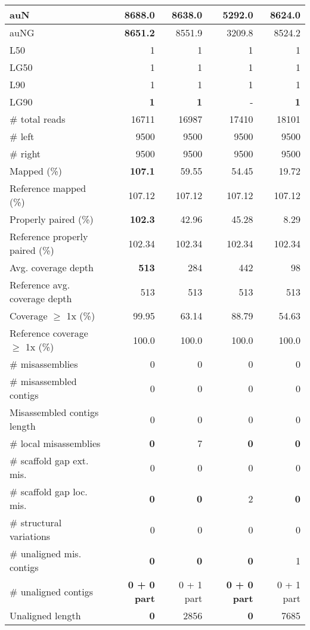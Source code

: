 \documentclass[12pt,a4paper]{article}
\begin{document}
\begin{table}[ht]
\begin{center}
\begin{tabular}{|l*{4}{|r}|}
auN & {\bf 8688.0} & 8638.0 & 5292.0 & 8624.0 \\ \hline
auNG & {\bf 8651.2} & 8551.9 & 3209.8 & 8524.2 \\ \hline
L50 & 1 & 1 & 1 & 1 \\ \hline
LG50 & 1 & 1 & 1 & 1 \\ \hline
L90 & 1 & 1 & 1 & 1 \\ \hline
LG90 & {\bf 1} & {\bf 1} & - & {\bf 1} \\ \hline
\# total reads & 16711 & 16987 & 17410 & 18101 \\ \hline
\# left & 9500 & 9500 & 9500 & 9500 \\ \hline
\# right & 9500 & 9500 & 9500 & 9500 \\ \hline
Mapped (\%) & {\bf 107.1} & 59.55 & 54.45 & 19.72 \\ \hline
Reference mapped (\%) & 107.12 & 107.12 & 107.12 & 107.12 \\ \hline
Properly paired (\%) & {\bf 102.3} & 42.96 & 45.28 & 8.29 \\ \hline
Reference properly paired (\%) & 102.34 & 102.34 & 102.34 & 102.34 \\ \hline
Avg. coverage depth & {\bf 513} & 284 & 442 & 98 \\ \hline
Reference avg. coverage depth & 513 & 513 & 513 & 513 \\ \hline
Coverage $\geq$ 1x (\%) & 99.95 & 63.14 & 88.79 & 54.63 \\ \hline
Reference coverage $\geq$ 1x (\%) & 100.0 & 100.0 & 100.0 & 100.0 \\ \hline
\# misassemblies & 0 & 0 & 0 & 0 \\ \hline
\# misassembled contigs & 0 & 0 & 0 & 0 \\ \hline
Misassembled contigs length & 0 & 0 & 0 & 0 \\ \hline
\# local misassemblies & {\bf 0} & 7 & {\bf 0} & {\bf 0} \\ \hline
\# scaffold gap ext. mis. & 0 & 0 & 0 & 0 \\ \hline
\# scaffold gap loc. mis. & {\bf 0} & {\bf 0} & 2 & {\bf 0} \\ \hline
\# structural variations & 0 & 0 & 0 & 0 \\ \hline
\# unaligned mis. contigs & {\bf 0} & {\bf 0} & {\bf 0} & 1 \\ \hline
\# unaligned contigs & {\bf 0 + 0 part} & 0 + 1 part & {\bf 0 + 0 part} & 0 + 1 part \\ \hline
Unaligned length & {\bf 0} & 2856 & {\bf 0} & 7685 \\ \hline

\end{tabular}
\end{center}
\end{table}
\end{document}
